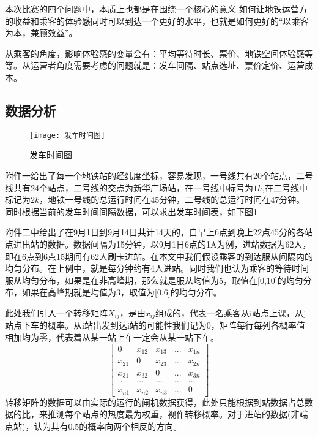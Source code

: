 \documentclass[12pt,a4paper]{mcmthesis}
\begin{document}
本次比赛的四个问题中，本质上也都是在围绕一个核心的意义-如何让地铁运营方的收益和乘客的体验感同时可以到达一个更好的水平，也就是如何更好的“以乘客为本，兼顾效益”。

从乘客的角度，影响体验感的变量会有：平均等待时长、票价、地铁空间体验感等等。从运营者角度需要考虑的问题就是：发车间隔、站点选址、票价定价、运营成本。


\subsection{数据分析}
\begin{figure}[h!t]
	\centerline{\texttt{[image: 发车时间图]}\quad
	}
	\caption{\song\wuhao
		发车时间图}
	\label{fig:发车时间图}
\end{figure}

附件一给出了每一个地铁站的经纬度坐标，容易发现，一号线共有20个站点，二号线共有24个站点，二号线的交点为新华广场站，在一号线中标号为$1h$,在二号线中标记为$2k$，地铁一号线的总运行时间在45分钟，二号线的总运行时间在47分钟。同时根据当前的发车时间间隔数据，可以求出发车时间表，如下图\ref{fig:发车时间图}

附件二中给出了在9月1日到9月14日共计14天的，自早上6点到晚上22点45分的各站点进出站的数据。数据间隔为15分钟，以9月1日6点的1A为例，进站数据为62人，即在6点到6点15期间有62人刷卡进站。在本文中我们假设乘客的到达服从间隔内的均匀分布。在上例中，就是每分钟约有4人进站。同时我们也认为乘客的等待时间服从均匀分布，如果是在非高峰期，那么就是服从均值为5，取值在[0,10]的均匀分布，如果在高峰期就是均值为3，取值为[0,6]的均匀分布。

此处我们引入一个转移矩阵$X_{ij}$，是由$x_{ij}$组成的，代表一名乘客从i站点上课，从j站点下车的概率。从i站出发到达i站的可能性我们记为0，矩阵每行每列各概率值相加均为零，代表着从某一站上车一定会从某一站下车。
\begin{equation}
\begin{bmatrix}
	0 &x_{12}  &x_{13} &... & x_{1n}\\ 
	x_{21} &0  &x_{23} & ... &x_{2n} \\ 
	x_{31} & x_{32} &0 & ...&x_{3n} \\ 
	...&  ... &   ...&  ... &...\\
	x_{n1} & x_{n2} &x_{n3} &... &0 
\end{bmatrix}
\end{equation}
转移矩阵的数据可以由实际的运行的闸机数据获得，此处只能根据到站数据占总数据的比，来推测每个站点的热度最为权重，视作转移概率。对于进站的数据(非端点站)，认为其有0.5的概率向两个相反的方向。
\end{document}
